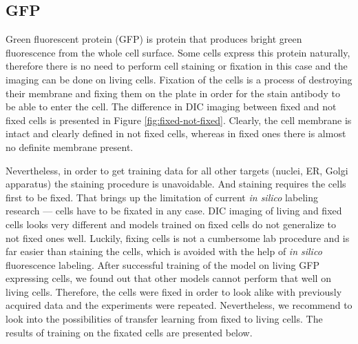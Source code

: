 \subsection{GFP}
    \label{section:gfp}
    Green fluorescent protein (GFP) is protein that produces bright green fluorescence from the whole cell surface. Some cells express this protein naturally, therefore there is no need to perform cell staining or fixation in this case and the imaging can be done on living cells. Fixation of the cells is a process of destroying their membrane and fixing them on the plate in order for the stain antibody to be able to enter the cell. The difference in DIC imaging between fixed and not fixed cells is presented in Figure \ref{fig:fixed-not-fixed}. Clearly, the cell membrane is intact and clearly defined in not fixed cells, whereas in fixed ones there is almost no definite membrane present. 
    
    Nevertheless, in order to get training data for all other targets (nuclei, ER, Golgi apparatus) the staining procedure is unavoidable. And staining requires the cells first to be fixed. That brings up the limitation of current \textit{in silico} labeling research --- cells have to be fixated in any case. DIC imaging of living and fixed cells looks very different and models trained on fixed cells do not generalize to not fixed ones well. Luckily, fixing cells is not a cumbersome lab procedure and is far easier than staining the cells, which is avoided with the help of \textit{in silico} fluorescence labeling. After successful training of the model on living GFP expressing cells, we found out that other models cannot perform that well on living cells. Therefore, the cells were fixed in order to look alike with previously acquired data and the experiments were repeated. Nevertheless, we recommend to look into the possibilities of transfer learning from fixed to living cells. The results of training on the fixated cells are presented below. 
    

